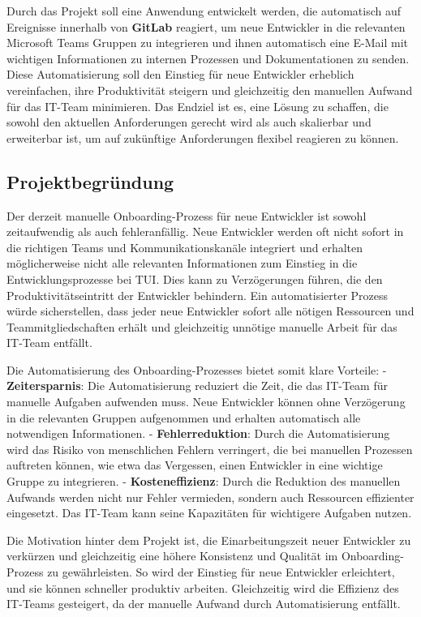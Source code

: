 Durch das Projekt soll eine Anwendung entwickelt werden, die automatisch auf Ereignisse innerhalb von \textbf{GitLab} reagiert, um neue Entwickler in die relevanten Microsoft Teams Gruppen zu integrieren und ihnen automatisch eine E-Mail mit wichtigen Informationen zu internen Prozessen und Dokumentationen zu senden. Diese Automatisierung soll den Einstieg für neue Entwickler erheblich vereinfachen, ihre Produktivität steigern und gleichzeitig den manuellen Aufwand für das IT-Team minimieren. Das Endziel ist es, eine Lösung zu schaffen, die sowohl den aktuellen Anforderungen gerecht wird als auch skalierbar und erweiterbar ist, um auf zukünftige Anforderungen flexibel reagieren zu können.

\subsection{Projektbegründung} 
\label{sec:Projektbegruendung}

Der derzeit manuelle Onboarding-Prozess für neue Entwickler ist sowohl zeitaufwendig als auch fehleranfällig. Neue Entwickler werden oft nicht sofort in die richtigen Teams und Kommunikationskanäle integriert und erhalten möglicherweise nicht alle relevanten Informationen zum Einstieg in die Entwicklungsprozesse bei TUI. Dies kann zu Verzögerungen führen, die den Produktivitätseintritt der Entwickler behindern. Ein automatisierter Prozess würde sicherstellen, dass jeder neue Entwickler sofort alle nötigen Ressourcen und Teammitgliedschaften erhält und gleichzeitig unnötige manuelle Arbeit für das IT-Team entfällt.

Die Automatisierung des Onboarding-Prozesses bietet somit klare Vorteile:
- \textbf{Zeitersparnis}: Die Automatisierung reduziert die Zeit, die das IT-Team für manuelle Aufgaben aufwenden muss. Neue Entwickler können ohne Verzögerung in die relevanten Gruppen aufgenommen und erhalten automatisch alle notwendigen Informationen.
- \textbf{Fehlerreduktion}: Durch die Automatisierung wird das Risiko von menschlichen Fehlern verringert, die bei manuellen Prozessen auftreten können, wie etwa das Vergessen, einen Entwickler in eine wichtige Gruppe zu integrieren.
- \textbf{Kosteneffizienz}: Durch die Reduktion des manuellen Aufwands werden nicht nur Fehler vermieden, sondern auch Ressourcen effizienter eingesetzt. Das IT-Team kann seine Kapazitäten für wichtigere Aufgaben nutzen.

Die Motivation hinter dem Projekt ist, die Einarbeitungszeit neuer Entwickler zu verkürzen und gleichzeitig eine höhere Konsistenz und Qualität im Onboarding-Prozess zu gewährleisten. So wird der Einstieg für neue Entwickler erleichtert, und sie können schneller produktiv arbeiten. Gleichzeitig wird die Effizienz des IT-Teams gesteigert, da der manuelle Aufwand durch Automatisierung entfällt.

